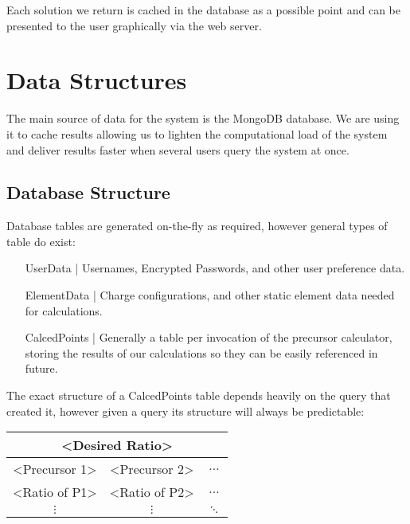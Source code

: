 \documentclass[a4paper, 12pt]{article}
\begin{document}
Each solution we return is cached in the database as a possible point and can be presented to the user graphically via the web server.

\pagebreak
\section{Data Structures}

The main source of data for the system is the MongoDB database. We are using it to cache results allowing us to lighten the computational load of the system and deliver results faster when several users query the system at once.

\subsection{Database Structure}
Database tables are generated on-the-fly as required, however general types of table do exist:

\begin{enumerate}[label = {}, leftmargin=\widthof{CalcedPoints |}+\labelsep]
	\item[UserData |] Usernames, Encrypted Passwords, and other user preference data.
	
	\item[ElementData |] Charge configurations, and other static element data needed for calculations.
	
	\item[CalcedPoints |] Generally a table per invocation of the precursor calculator, storing the results of our calculations so they can be easily referenced in future. 
\end{enumerate}

The exact structure of a CalcedPoints table depends heavily on the query that created it, however given a query its structure will always be predictable: 

\begin{table}[h!]
	\centering
	\begin{tabular}{|c|c|c|}
		\hline
		\multicolumn{3}{|c|}{\textless{}Desired Ratio\textgreater{}} \\ \hline
		\textless{}Precursor 1\textgreater{} & \textless{}Precursor 2\textgreater{} & $\dots$ \\ \hline
		\textless{}Ratio of P1\textgreater{} & \textless{}Ratio of P2\textgreater{} & $\dots$ \\
		$\vdots$ & $\vdots$ & $\ddots$ \\
	\end{tabular}
\end{table}
\end{document}

